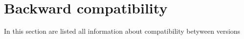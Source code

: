 \section{Backward compatibility}
In this section are listed all information about compatibility betyween versions